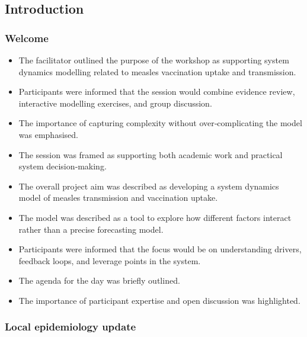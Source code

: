\documentclass{article}
\begin{document}
\subsection{Introduction}
\subsubsection{Welcome}
\begin{itemize}
    \item The facilitator outlined the purpose of the workshop as supporting system dynamics modelling related to measles vaccination uptake and transmission.
    \item Participants were informed that the session would combine evidence review, interactive modelling exercises, and group discussion.
    \item The importance of capturing complexity without over‑complicating the model was emphasised.
    \item The session was framed as supporting both academic work and practical system decision‑making.
    \item The overall project aim was described as developing a system dynamics model of measles transmission and vaccination uptake.
    \item The model was described as a tool to explore how different factors interact rather than a precise forecasting model.
    \item Participants were informed that the focus would be on understanding drivers, feedback loops, and leverage points in the system.
    \item The agenda for the day was briefly outlined.
    \item The importance of participant expertise and open discussion was highlighted.
\end{itemize}

\subsubsection{Local epidemiology update} 
\end{document}
